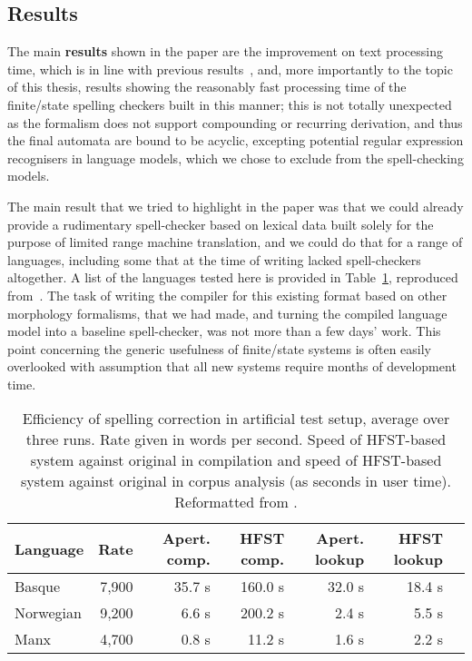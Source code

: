 \documentclass[officiallayout,final]{unihelcompling}
\begin{document}
\subsection{Results}

The main \textbf{results} shown in the paper are the improvement on text
processing time, which is in line with previous
results~\citep{silfverberg2009hfst}, and, more importantly to the topic of this
thesis, results showing the reasonably fast processing time of the
finite\-/state spelling checkers built in this manner; this is not totally
unexpected as the \gls{formalism} does not support compounding or recurring
derivation, and thus the final automata are bound to be acyclic, excepting
potential regular expression recognisers in language models, which we chose to
exclude from the spell-checking models.

The main result that we tried to highlight in the paper was that we could
already provide a rudimentary spell-checker based on lexical data built solely
for the purpose of limited range machine translation, and we could do that for
a range of languages, including some that at the time of writing lacked
spell-checkers altogether. A list of the languages tested here is provided in
Table~\ref{table:lrec-2012-repro}, reproduced
from~. The task of writing the compiler for
this existing format based on other morphology \glspl{formalism}, that we had
made, and turning the compiled language model into a baseline spell-checker,
was not more than a few days' work. This point concerning the generic
usefulness of finite\-/state systems is often easily overlooked with assumption
that all new systems require months of development time.

\begin{table}
    \centering
    \begin{small}
\begin{tabular}{|l|r|r||r|r||r|r|}
\hline
\bf Language & \bf Rate & \bf Apert. comp. & \bf HFST comp. & \bf Apert. lookup & \bf HFST lookup \\
\hline
Basque       &  7,900  & 35.7 s & 160.0  s & 32.0 s & 18.4 s \\
Norwegian    &  9,200  & 6.6 s  & 200.2 s  & 2.4 s  & 5.5  s \\
Manx         &  4,700  & 0.8 s  & 11.2  s  & 1.6 s  & 2.2  s \\
\hline
\end{tabular}
\end{small}
  \caption{Efficiency of spelling correction in artificial test setup, average 
  over three runs. Rate given in words per second. 
  Speed of HFST-based system against original in compilation
  and speed of HFST-based system against original in corpus analysis (as
  seconds in user time).  Reformatted from .
  \label{table:lrec-2012-repro}}
\end{table}
\end{document}
